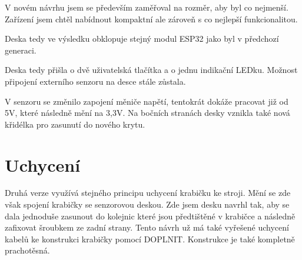 V novém návrhu jsem se především zaměřoval na rozměr, aby byl co nejmenší.
Zařízení jsem chtěl nabídnout kompaktní ale zároveň s co nejlepší funkcionalitou.

Deska tedy ve výsledku obklopuje stejný modul ESP32 jako byl v předchozí generaci.

Deska tedy přišla o dvě uživatelská tlačítka a o jednu indikační LEDku. 
Možnost připojení externího senzoru na desce stále zůstala.

V senzoru se změnilo zapojení měniče napětí, tentokrát dokáže pracovat již od 5V, které následně mění na 3,3V.
Na bočních stranách desky vznikla také nová křidélka pro zasunutí do nového krytu.

\fxnote[author=JA]{\textcolor{mygreen}{krabička popis, uchycení}}
\fxnote[author=JA]{\textcolor{mygreen}{Obrázek deksa => krabička}}

\section{Uchycení}
Druhá verze využívá stejného principu uchycení krabičku ke stroji. 
Mění se zde však spojení krabičky se senzorovou deskou. 
Zde jsem desku navrhl tak, aby se dala jednoduše zasunout do kolejnic které jsou předtištěné v krabičce a následně zafixovat šroubkem ze zadní strany.
Tento návrh už má také vyřešené uchycení kabelů ke konstrukci krabičky pomocí \textcolor{mygreen}{DOPLNIT}.
Konstrukce je také kompletně prachotěsná.




\newpage